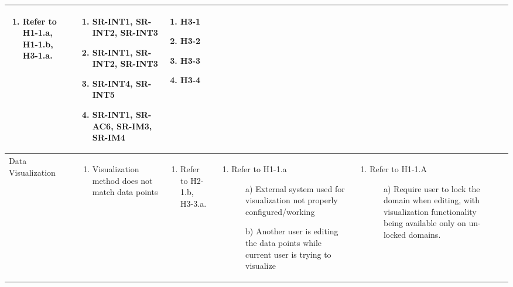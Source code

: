 \documentclass{article}
\begin{document}
\begin{landscape}
\begin{longtable}{|p{3cm}|p{3cm}|p{4cm}|p{4cm}|p{3cm}|p{2cm}|p{3cm}|}
\begin{enumerate}[leftmargin=*]
\begin{enumerate}
    \end{enumerate}
    \item Refer to H1-1.a, H1-1.b, H3-1.a.
  \end{enumerate} &
  \begin{enumerate}[leftmargin=*]
    \item SR-INT1, SR-INT2, SR-INT3
    \item SR-INT1, SR-INT2, SR-INT3
    \item SR-INT4, SR-INT5 
    \item SR-INT1, SR-AC6, SR-IM3, SR-IM4

  \end{enumerate} &
  \begin{enumerate}[leftmargin=*]
    \item H3-1
    \item H3-2
    \item H3-3
    \item H3-4
  \end{enumerate} \\
  \hline
 Data Visualization & 
  \begin{enumerate}[leftmargin=*]
      \item Visualization method does not match data points
  \end{enumerate} & 
  \begin{enumerate}[leftmargin=*]
      \item Refer to H2-1.b, H3-3.a.
  \end{enumerate} &
  \begin{enumerate}[leftmargin=*]
    \item Refer to H1-1.a
    \begin{enumerate}
        \item[a)] External system used for visualization not properly configured/working
        \item[b)] Another user is editing the data points while current user is trying to visualize
    \end{enumerate}
  \end{enumerate} &
  \begin{enumerate}[leftmargin=*]
    \item Refer to H1-1.A
    \begin{enumerate}
        \item[a)] Require user to lock the domain when editing, with visualization functionality being available only on un-locked domains.
    \end{enumerate}
  \end{enumerate} &

\end{longtable}
\end{landscape}
\end{document}
